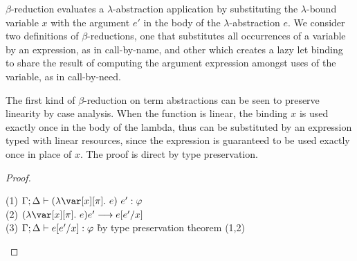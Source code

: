 $\beta$-reduction evaluates a $\lambda$-abstraction application by substituting
the $\lambda$-bound variable $x$ with the argument $e'$ in the body of the
$\lambda$-abstraction $e$.
%
We consider two definitions of $\beta$-reductions, one that substitutes all
occurrences of a variable by an expression, as in call-by-name, and other which
creates a lazy let binding to share the result of computing the argument
expression amongst uses of the variable, as in call-by-need.

The first kind of $\beta$-reduction on term abstractions can be seen to
preserve linearity by case analysis. When the function is linear, the binding
$x$ is used exactly once in the body of the lambda, thus can be substituted by
an expression typed with linear resources, since the expression is guaranteed
to be used exactly once in place of $x$. The proof is direct by type preservation.

\BetaReductionTheorem

\begin{proof}~

\begin{tabbing}
    (1) $\G; \D \vdash (\lambda \x[\pi].~e)~e' : \vp$\\
    (2) $(\lambda \x[\pi].~e) e' \longrightarrow e[e'/x]$\\
    (3) $\Gamma; \Delta \vdash e[e'/x] : \varphi$ \` by type preservation theorem (1,2)\\

\end{tabbing}
\end{proof}

